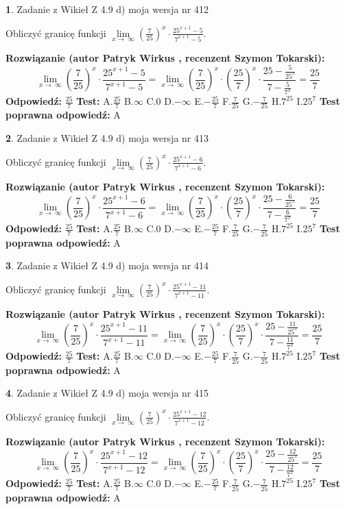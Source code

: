 \documentclass[12pt, a4paper]{article}
\theoremstyle{definition} %
\newtheorem{zad}{}
\newcommand{\zadStart}[1]{\begin{zad}#1\newline}
\newcommand{\zadStop}{\end{zad}}
\newcommand{\rozwStart}[2]{\noindent \textbf{Rozwiązanie (autor #1 , recenzent #2): }\newline}
\newcommand{\rozwStop}{\newline}
\newcommand{\odpStart}{\noindent \textbf{Odpowiedź:}\newline}
\newcommand{\odpStop}{\newline}
\newcommand{\testStart}{\noindent \textbf{Test:}\newline}
\newcommand{\testStop}{\newline}
\newcommand{\kluczStart}{\noindent \textbf{Test poprawna odpowiedź:}\newline}
\newcommand{\kluczStop}{\newline}
\begin{document}
\zadStart{Zadanie z Wikieł Z 4.9 d) moja wersja nr 412}


Obliczyć granicę funkcji  $\lim\limits_{x\to\ \infty}(\frac{7}{25})^{x}\cdot\frac{25^{x+1}-5}{7^{x+1}-5}$.
\zadStop
\rozwStart{Patryk Wirkus}{Szymon Tokarski}
$$\lim\limits_{x\to\ \infty}(\frac{7}{25})^{x}\cdot\frac{25^{x+1}-5}{7^{x+1}-5}=\lim\limits_{x\to\ \infty}(\frac{7}{25})^{x}\cdot(\frac{25}{7})^{x} \cdot \frac{25-\frac{5}{25^{x}}}{7-\frac{5}{7^{x}}} = \frac{25}{7}$$
\rozwStop
\odpStart
$\frac{25}{7}$
\odpStop
\testStart
A.$\frac{25}{7}$ B.$\infty$ C.$0$ D.$-\infty$ E.$-\frac{25}{7}$
F.$\frac{7}{25}$ G.$-\frac{7}{25}$
H.$7^{25}$
I.$25^{7}$
\testStop
\kluczStart
A
\kluczStop



\zadStart{Zadanie z Wikieł Z 4.9 d) moja wersja nr 413}


Obliczyć granicę funkcji  $\lim\limits_{x\to\ \infty}(\frac{7}{25})^{x}\cdot\frac{25^{x+1}-6}{7^{x+1}-6}$.
\zadStop
\rozwStart{Patryk Wirkus}{Szymon Tokarski}
$$\lim\limits_{x\to\ \infty}(\frac{7}{25})^{x}\cdot\frac{25^{x+1}-6}{7^{x+1}-6}=\lim\limits_{x\to\ \infty}(\frac{7}{25})^{x}\cdot(\frac{25}{7})^{x} \cdot \frac{25-\frac{6}{25^{x}}}{7-\frac{6}{7^{x}}} = \frac{25}{7}$$
\rozwStop
\odpStart
$\frac{25}{7}$
\odpStop
\testStart
A.$\frac{25}{7}$ B.$\infty$ C.$0$ D.$-\infty$ E.$-\frac{25}{7}$
F.$\frac{7}{25}$ G.$-\frac{7}{25}$
H.$7^{25}$
I.$25^{7}$
\testStop
\kluczStart
A
\kluczStop



\zadStart{Zadanie z Wikieł Z 4.9 d) moja wersja nr 414}


Obliczyć granicę funkcji  $\lim\limits_{x\to\ \infty}(\frac{7}{25})^{x}\cdot\frac{25^{x+1}-11}{7^{x+1}-11}$.
\zadStop
\rozwStart{Patryk Wirkus}{Szymon Tokarski}
$$\lim\limits_{x\to\ \infty}(\frac{7}{25})^{x}\cdot\frac{25^{x+1}-11}{7^{x+1}-11}=\lim\limits_{x\to\ \infty}(\frac{7}{25})^{x}\cdot(\frac{25}{7})^{x} \cdot \frac{25-\frac{11}{25^{x}}}{7-\frac{11}{7^{x}}} = \frac{25}{7}$$
\rozwStop
\odpStart
$\frac{25}{7}$
\odpStop
\testStart
A.$\frac{25}{7}$ B.$\infty$ C.$0$ D.$-\infty$ E.$-\frac{25}{7}$
F.$\frac{7}{25}$ G.$-\frac{7}{25}$
H.$7^{25}$
I.$25^{7}$
\testStop
\kluczStart
A
\kluczStop



\zadStart{Zadanie z Wikieł Z 4.9 d) moja wersja nr 415}


Obliczyć granicę funkcji  $\lim\limits_{x\to\ \infty}(\frac{7}{25})^{x}\cdot\frac{25^{x+1}-12}{7^{x+1}-12}$.
\zadStop
\rozwStart{Patryk Wirkus}{Szymon Tokarski}
$$\lim\limits_{x\to\ \infty}(\frac{7}{25})^{x}\cdot\frac{25^{x+1}-12}{7^{x+1}-12}=\lim\limits_{x\to\ \infty}(\frac{7}{25})^{x}\cdot(\frac{25}{7})^{x} \cdot \frac{25-\frac{12}{25^{x}}}{7-\frac{12}{7^{x}}} = \frac{25}{7}$$
\rozwStop
\odpStart
$\frac{25}{7}$
\odpStop
\testStart
A.$\frac{25}{7}$ B.$\infty$ C.$0$ D.$-\infty$ E.$-\frac{25}{7}$
F.$\frac{7}{25}$ G.$-\frac{7}{25}$
H.$7^{25}$
I.$25^{7}$
\testStop
\kluczStart
A
\kluczStop
\end{document}
